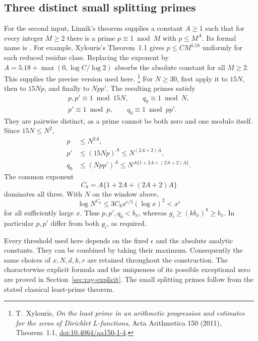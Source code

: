 \subsection{Three distinct small splitting primes}

For the second input, Linnik's theorem supplies a constant \(A\geq1\)
such that for every
integer \(M\geq2\) there is a prime \(p\equiv1\bmod M\) with
\(p\leq M^A\). Its formal name is . For example, Xylouris's
Theorem~1.1 gives \(p\leq C M^{5.18}\) uniformly for each reduced
residue class. Replacing the exponent by
\(A=5.18+\max(0,\log C/\log2)\) absorbs the absolute constant for
all \(M\geq2\). This supplies the precise version used here.
\footnote{T.~Xylouris, \emph{On the least prime in an arithmetic
progression and estimates for the zeros of Dirichlet \(L\)-functions},
Acta Arithmetica 150 (2011), Theorem~1.1,
\href{https://doi.org/10.4064/aa150-1-4}{doi:10.4064/aa150-1-4}.}
For \(N\geq30\), first apply it to \(15N\), then to \(15Np\),
and finally to \(Npp'\). The resulting primes satisfy
\[
 \begin{gathered}
 p,p'\equiv1\bmod15N,\qquad q_0\equiv1\bmod N,\\
 p'\equiv1\bmod p,\qquad q_0\equiv1\bmod pp' .
 \end{gathered}
\]
They are pairwise distinct, as a prime cannot be both zero and one
modulo itself. Since \(15N\leq N^2\),
\[
 \begin{split}
 p&\leq N^{2A},\\
 p'&\leq (15Np)^A\leq N^{(2A+2)A},\\
 q_0&\leq (Npp')^A
             \leq N^{A\{1+2A+(2A+2)A\}}.
 \end{split}
\]
The common exponent
\[
                    C_8=A\{1+2A+(2A+2)A\}
\]
dominates all three. With \(N\) on the window above,
\[
 \log N^{C_8}
     \leq3C_8x^{\epsilon/5}(\log x)^2<x^\epsilon
\]
for all sufficiently large \(x\). Thus \(p,p',q_0<b_x\), whereas
\(g_i\geq(kb_x)^8\geq b_x\).
In particular \(p,p'\) differ from both \(g_i\), as required.

Every threshold used here depends on the fixed \(\epsilon\) and the
absolute analytic constants. They can be combined by taking their
maximum. Consequently the same choices of \(x,N,d,k,r\) are retained
throughout the construction. The characterwise explicit formula and the uniqueness of its possible
exceptional zero are proved in Section~\ref{sec:ray-explicit}. The small splitting primes follow from the
stated classical least-prime theorem.

